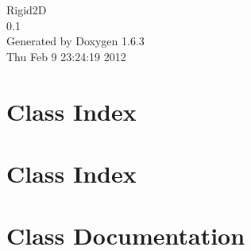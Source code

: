 \documentclass[a4paper]{book}
\begin{document}
\hypersetup{pageanchor=false}
\begin{titlepage}
\vspace*{7cm}
\begin{center}
{\Large Rigid2D \\[1ex]\large 0.1 }\\
\vspace*{1cm}
{\large Generated by Doxygen 1.6.3}\\
\vspace*{0.5cm}
{\small Thu Feb 9 23:24:19 2012}\\
\end{center}
\end{titlepage}
\clearemptydoublepage
{}
\tableofcontents
\clearemptydoublepage
{}
\hypersetup{pageanchor=true}
\chapter{Class Index}

\chapter{Class Index}

\chapter{Class Documentation}
















\printindex
\end{document}
